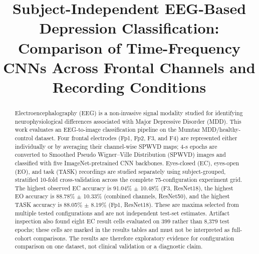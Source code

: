 \documentclass[conference]{IEEEtran}
\begin{document}
\title{Subject-Independent EEG-Based Depression Classification:
Comparison of Time-Frequency CNNs Across Frontal Channels and
Recording Conditions}

\author{
\and
{}
\and
{}
\and
{}
\and
{}
}

\maketitle

\begin{abstract}
Electroencephalography (EEG) is a non-invasive signal modality studied
for identifying neurophysiological differences associated with Major
Depressive Disorder (MDD). This work evaluates an EEG-to-image
classification pipeline on the Mumtaz MDD/healthy-control dataset.
Four frontal electrodes (Fp1, Fp2, F3, and F4) are represented either
individually or by averaging their channel-wise SPWVD maps; 4-s epochs are converted to
Smoothed Pseudo Wigner--Ville Distribution (SPWVD) images and classified
with five ImageNet-pretrained CNN backbones. Eyes-closed (EC),
eyes-open (EO), and task (TASK) recordings are studied separately using
subject-grouped, stratified 10-fold cross-validation across the complete
75-configuration experiment grid. The highest observed EC accuracy is
91.04\% $\pm$
10.48\% (F3, ResNet18), the highest EO accuracy is 88.78\% $\pm$
10.33\% (combined channels, ResNet50), and the highest TASK accuracy
is 88.05\% $\pm$ 8.19\% (Fp1, ResNet18). These are maxima selected from
multiple tested configurations and are not independent test-set
estimates. Artifact inspection also found eight EC result cells evaluated
on 399 rather than 8,379 test epochs; these cells are marked in the
results tables and must not be interpreted as full-cohort comparisons.
The results are therefore exploratory evidence for configuration
comparison on one dataset, not clinical validation or a diagnostic
claim.
\end{abstract}
\end{document}

